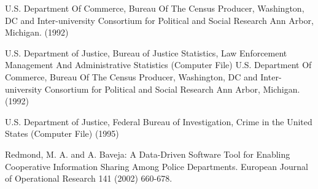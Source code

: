 \documentclass[9pt, conference]{IEEEtran}
\begin{document}
U.S. Department Of Commerce, Bureau Of The Census Producer, Washington, DC and 
Inter-university Consortium for Political and Social Research Ann Arbor, Michigan. 
(1992)

U.S. Department of Justice, Bureau of Justice Statistics, Law Enforcement Management 
And Administrative Statistics (Computer File) U.S. Department Of Commerce, Bureau Of 
The Census Producer, Washington, DC and Inter-university Consortium for Political and 
Social Research Ann Arbor, Michigan. (1992)

U.S. Department of Justice, Federal Bureau of Investigation, Crime in the United 
States (Computer File) (1995)

Redmond, M. A. and A. Baveja: A Data-Driven Software Tool for Enabling Cooperative 
Information Sharing Among Police Departments. European Journal of Operational Research 
141 (2002) 660-678. 



\end{document}

